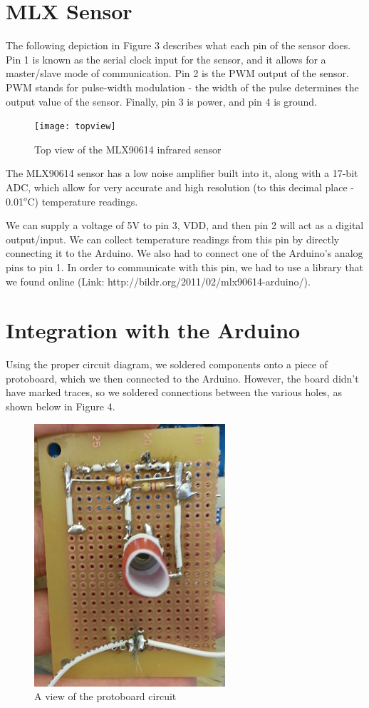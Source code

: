\documentclass[11pt]{article}
\begin{document}
\section{MLX Sensor}

The following depiction in Figure 3 describes what each pin of the sensor does. Pin 1 is known as the serial clock input for the sensor, and it allows for a master/slave mode of communication. Pin 2 is the PWM output of the sensor. PWM stands for pulse-width modulation - the width of the pulse determines the output value of the sensor. Finally, pin 3 is power, and pin 4 is ground.

\begin{figure}[!ht]
	\centering
	\texttt{[image: topview]}
	\caption{Top view of the MLX90614 infrared sensor}
	\label{fig:cover}
\end{figure}

The MLX90614 sensor has a low noise amplifier built into it, along with a 17-bit ADC, which allow for very accurate and high resolution (to this decimal place - 0.01$^o$C) temperature readings.

We can supply a voltage of 5V to pin 3, VDD, and then pin 2 will act as a digital output/input. We can collect temperature readings from this pin by directly connecting it to the Arduino. We also had to connect one of the Arduino's analog pins to pin 1. In order to communicate with this pin, we had to use a library that we found online (Link: http://bildr.org/2011/02/mlx90614-arduino/).

\section{Integration with the Arduino}
Using the proper circuit diagram, we soldered components onto a piece of protoboard, which we then connected to the Arduino. However, the board didn't have marked traces, so we soldered connections between the various holes, as shown below in Figure 4.

\begin{figure}[!ht]
	\centering
	\includegraphics[width=.3\textwidth]{protoboard}
	\caption{A view of the protoboard circuit}
\end{figure}
\end{document}
